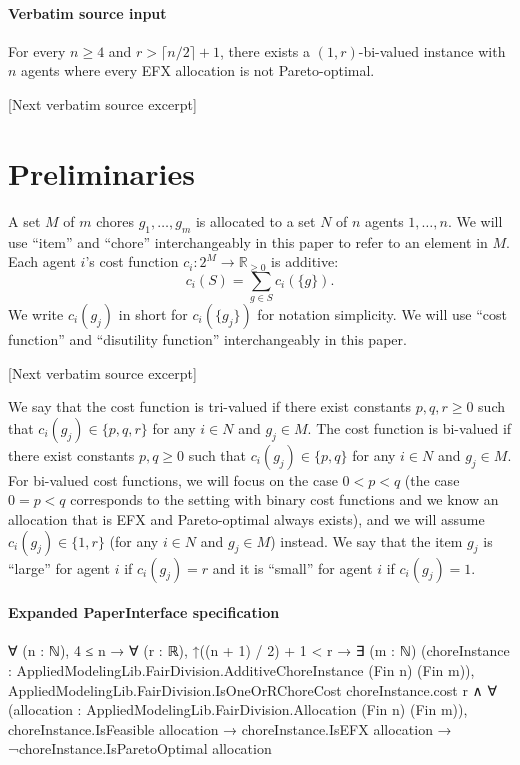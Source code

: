\documentclass[10pt]{article}
\begin{document}
\paragraph{Verbatim source input}
\begin{ReviewVerbatim}
\begin{theorem}\label{thm:EFXPO}
    For every $n\geq 4$ and $r>\lceil n/2\rceil+1$, there exists a $(1,r)$-bi-valued instance with $n$ agents where every EFX allocation is not Pareto-optimal.
\end{theorem}

[Next verbatim source excerpt]

\section{Preliminaries}
A set $M$ of $m$ chores $g_1,\ldots,g_m$ is allocated to a set $N$ of $n$ agents $1,\ldots,n$.
We will use ``item'' and ``chore'' interchangeably in this paper to refer to an element in $M$.
Each agent $i$'s cost function $c_i:2^M\to\mathbb{R}_{\geq0}$ is additive:
$$c_i(S)=\sum_{g\in S}c_i(\{g\}).$$
We write $c_i(g_j)$ in short for $c_i(\{g_j\})$ for notation simplicity.
We will use ``cost function'' and ``disutility function'' interchangeably in this paper.

[Next verbatim source excerpt]

We say that the cost function is tri-valued if there exist constants $p,q,r\geq 0$ such that $c_i(g_j)\in\{p,q,r\}$ for any $i\in N$ and $g_j\in M$.
The cost function is bi-valued if there exist constants $p,q\geq 0$ such that $c_i(g_j)\in\{p,q\}$ for any $i\in N$ and $g_j\in M$.
For bi-valued cost functions, we will focus on the case $0<p<q$ (the case $0=p<q$ corresponds to the setting with binary cost functions and we know an allocation that is EFX and Pareto-optimal always exists), and we will assume $c_i(g_j)\in\{1,r\}$ (for any $i\in N$ and $g_j\in M$) instead.
We say that the item $g_j$ is ``large'' for agent $i$ if $c_i(g_j)=r$ and it is ``small'' for agent $i$ if $c_i(g_j)=1$.
\end{ReviewVerbatim}



\paragraph{Expanded PaperInterface specification}
\begin{ReviewVerbatim}
∀ (n : ℕ),
  4 ≤ n →
    ∀ (r : ℝ),
      ↑((n + 1) / 2) + 1 < r →
        ∃ (m : ℕ) (choreInstance : AppliedModelingLib.FairDivision.AdditiveChoreInstance (Fin n) (Fin m)),
          AppliedModelingLib.FairDivision.IsOneOrRChoreCost choreInstance.cost r ∧
            ∀ (allocation : AppliedModelingLib.FairDivision.Allocation (Fin n) (Fin m)),
              choreInstance.IsFeasible allocation →
                choreInstance.IsEFX allocation → ¬choreInstance.IsParetoOptimal allocation
\end{ReviewVerbatim}
\end{document}
